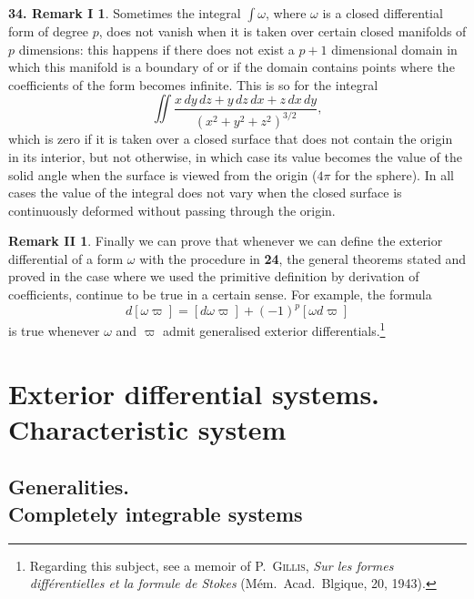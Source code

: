 \documentclass[leqno,11pt]{book}
\numberwithin{equation}{chapter}
\theoremstyle{shape1}
\theoremstyle{shape0}
\theoremstyle{shape2}
\theoremstyle{definition}
\begin{document}
\theoremstyle{shape0}
\newtheorem*{rmk34}{\hspace{15pt}\textbf{34.} Remark I}
\newtheorem*{rmkii}{\hspace{15pt}Remark II}
\begin{rmk34}
  Sometimes the integral $\int\omega$, where $\omega$ is a closed differential form of degree $p$, does not vanish when it is taken over certain closed manifolds of $p$ dimensions: this happens if there does not exist a $p+1$ dimensional domain in which this manifold is a boundary of or if the domain contains points where the coefficients of the form becomes infinite. This is so for the integral
\[
\iint\frac{x\,dy\,dz+y\,dz\,dx+z\,dx\,dy}{(x^{2}+y^{2}+z^{2})^{3/2}},
\]
which is zero if it is taken over a closed surface that does not contain the origin in its interior, but not otherwise, in which case its value becomes the value of the solid angle when the surface is viewed from the origin ($4\pi$ for the sphere). In all cases the value of the integral does not vary when the closed surface is continuously deformed without passing through the origin.  
\end{rmk34}
\begin{rmkii}
  Finally we can prove that whenever we can define the exterior differential of a form $\omega$ with the procedure in \textsection\textbf{24}, the general theorems stated and proved in the case where we used the primitive definition by  derivation of coefficients,  continue to be true in a certain sense. For example, the formula
\[
d[\omega\varpi]=[d\omega\varpi]+(-1)^{p}[\omega d\varpi]
\]
is true whenever $\omega$ and $\varpi$ admit generalised exterior differentials.\footnote{Regarding this subject, see a memoir of \textsc{P.~Gillis}, \emph{Sur les formes diff\'erentielles et la formule de Stokes} (M\'em.~Acad.~Blgique, 20, 1943).}
\end{rmkii}

\chapter{Exterior differential systems. Characteristic system}
\label{cha:exter-diff-syst}
\section[Generalities. Completely integrable systems]{Generalities.\\Completely integrable systems}
\label{sec:gener-compl-integr}
\end{document}
